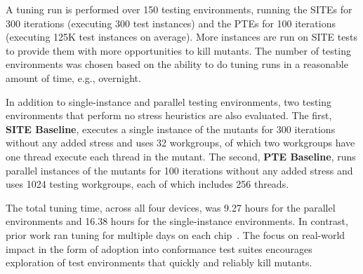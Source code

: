 A tuning run is performed over 150 testing environments, running the SITEs for 300 iterations (executing 300 test instances) and the PTEs for 100 iterations (executing 125K test instances on average). More instances are run on SITE tests to provide them with more opportunities to kill mutants. The number of testing environments was chosen based on the ability to do tuning runs in a reasonable amount of time, e.g., overnight.

In addition to single-instance and parallel testing environments, two testing environments that perform no stress heuristics are also evaluated. The first, \textbf{SITE Baseline}, executes a single instance of the mutants for 300 iterations without any added stress and uses 32 workgroups, of which two workgroups have one thread execute each thread in the mutant. The second, \textbf{PTE Baseline}, runs parallel instances of the mutants for 100 iterations without any added stress and uses 1024 testing workgroups, each of which includes 256 threads.

The total tuning time, across all four devices, was 9.27 hours for the parallel environments and 16.38 hours for the single-instance environments.  In contrast, prior work ran tuning for multiple days on each chip~\cite{kirkham2020foundations}.  The focus on real-world impact in the form of adoption into conformance test suites encourages exploration of test environments that quickly and reliably kill mutants.

